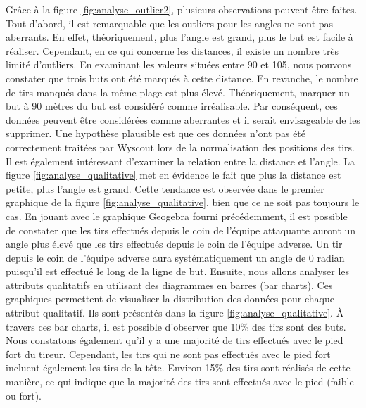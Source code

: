 \documentclass[12pt]{article}
\begin{document}
Grâce à la figure \ref{fig:analyse_outlier2}, plusieurs observations peuvent être faites. 
Tout d'abord, il est remarquable que les outliers pour les angles ne sont pas aberrants. 
En effet, théoriquement, plus l'angle est grand, plus le but est facile à réaliser. 
Cependant, en ce qui concerne les distances, il existe un nombre très limité d'outliers. 
En examinant les valeurs situées entre 90 et 105, nous pouvons constater que trois buts ont été marqués à cette distance. 
En revanche, le nombre de tirs manqués dans la même plage est plus élevé.
Théoriquement, marquer un but à 90 mètres du but est considéré comme irréalisable. 
Par conséquent, ces données peuvent être considérées comme aberrantes et il serait envisageable de les supprimer. 
Une hypothèse plausible est que ces données n'ont pas été correctement traitées par Wyscout lors de la normalisation des positions des tirs.
\newline\newline
Il est également intéressant d'examiner la relation entre la distance et l'angle. 
La figure \ref{fig:analyse_qualitative} met en évidence le fait que plus la distance est petite, plus l'angle est grand. 
Cette tendance est observée dans le premier graphique de la figure \ref{fig:analyse_qualitative}, bien que ce ne soit pas toujours le cas. 
En jouant avec le graphique Geogebra fourni précédemment, il est possible de constater que les tirs effectués depuis le coin de l'équipe attaquante auront un angle plus élevé que les tirs effectués depuis le coin de l'équipe adverse.
Un tir depuis le coin de l'équipe adverse aura systématiquement un angle de 0 radian puisqu'il est effectué le long de la ligne de but.
\newline\newline
Ensuite, nous allons analyser les attributs qualitatifs en utilisant des diagrammes en barres (bar charts). 
Ces graphiques permettent de visualiser la distribution des données pour chaque attribut qualitatif. 
Ils sont présentés dans la figure \ref{fig:analyse_qualitative}. 
À travers ces bar charts, il est possible d'observer que 10\% des tirs sont des buts. 
Nous constatons également qu'il y a une majorité de tirs effectués avec le pied fort du tireur. 
Cependant, les tirs qui ne sont pas effectués avec le pied fort incluent également les tirs de la tête.
Environ 15\% des tirs sont réalisés de cette manière, ce qui indique que la majorité des tirs sont effectués avec le pied (faible ou fort).
\newline\newline
\end{document}
